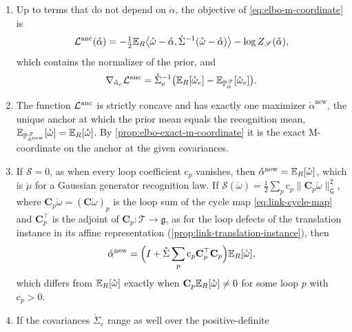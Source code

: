 \begin{enumerate}
\item[(a)] Up to terms that do not depend on $\mathring\alpha$, the objective of
\eqref{eq:elbo-m-coordinate} is
\begin{equation}
\mathcal L^{\mathrm{anc}}(\mathring\alpha)=-\tfrac12\mathbb E_R\bigl\langle\mathring\omega-\mathring\alpha,\mathring\Sigma^{-1}(\mathring\omega-\mathring\alpha)\bigr\rangle-\log Z_{\mathscr S}(\mathring\alpha),
\label{eq:link-anchor-objective}
\end{equation}
which contains the normalizer of the prior, and
\begin{equation}
\nabla_{\mathring\alpha_e}\mathcal L^{\mathrm{anc}}=\mathring\Sigma_e^{-1}\bigl(\mathbb E_R[\mathring\omega_e]-\mathbb E_{\mathbb P^{\mathscr T}_{\mathring\alpha}}[\mathring\omega_e]\bigr).
\label{eq:link-anchor-gradient}
\end{equation}
\item[(b)] The function $\mathcal L^{\mathrm{anc}}$ is strictly concave and has exactly one maximizer
$\mathring\alpha^{\mathrm{new}}$, the unique anchor at which the prior mean equals the recognition
mean, $\mathbb E_{\mathbb P^{\mathscr T}_{\mathring\alpha^{\mathrm{new}}}}[\mathring\omega]=\mathbb E_R[\mathring\omega]$. By
\cref{prop:elbo-exact-m-coordinate} it is the exact M-coordinate on the anchor at the given
covariances.
\item[(c)] If $\mathscr S=0$, as when every loop coefficient $\mathrm c_p$ vanishes, then
$\mathring\alpha^{\mathrm{new}}=\mathbb E_R[\mathring\omega]$, which is $\mathring\mu$ for a Gaussian
generator recognition law. If
$\mathscr S(\mathring\omega)=\tfrac12\sum_p\mathrm c_p\lVert\mathbf C_p\mathring\omega\rVert_{\mathsf G}^2$,
where $\mathbf C_p\mathring\omega=(\mathbf C\mathring\omega)_p$ is the loop sum of the cycle map
\eqref{eq:link-cycle-map} and $\mathbf C_p^\top$ is the adjoint of $\mathbf C_p:\mathscr T\to\mathfrak g$,
as for the loop defects of the translation instance in its affine representation
(\cref{prop:link-translation-instance}), then
\begin{equation}
\mathring\alpha^{\mathrm{new}}=\Bigl(I+\mathring\Sigma\sum_p\mathrm c_p\mathbf C_p^\top\mathbf C_p\Bigr)\mathbb E_R[\mathring\omega],
\label{eq:link-anchor-quadratic}
\end{equation}
which differs from $\mathbb E_R[\mathring\omega]$ exactly when $\mathbf C_p\mathbb E_R[\mathring\omega]\neq0$ for
some loop $p$ with $\mathrm c_p>0$.
\item[(d)] If the covariances $\mathring\Sigma_e$ range as well over the positive-definite

\end{enumerate}
